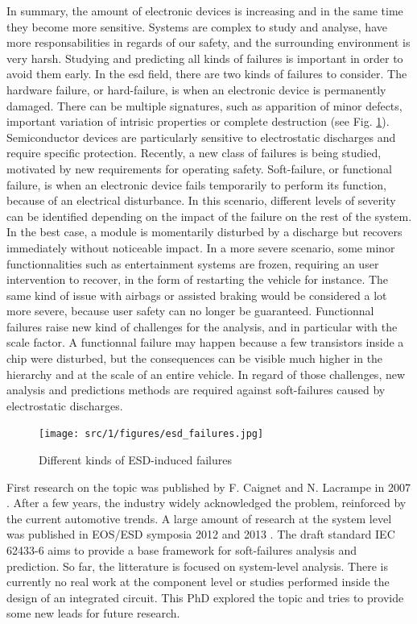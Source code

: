 In summary, the amount of electronic devices is increasing and in the same time they become more sensitive.
Systems are complex to study and analyse, have more responsabilities in regards of our safety, and the surrounding environment is very harsh.
Studying and predicting all kinds of failures is important in order to avoid them early.
In the \gls{esd} field, there are two kinds of failures to consider.
The hardware failure, or hard-failure, is when an electronic device is permanently damaged.
There can be multiple signatures, such as apparition of minor defects, important variation of intrisic properties or complete destruction (see Fig. \ref{fig:esd-failures}).
Semiconductor devices are particularly sensitive to electrostatic discharges \cite{impactESDsemiconductors} and require specific protection.
Recently, a new class of failures is being studied, motivated by new requirements for operating safety.
Soft-failure, or functional failure, is when an electronic device fails temporarily to perform its function, because of an electrical disturbance.
In this scenario, different levels of severity can be identified depending on the impact of the failure on the rest of the system.
In the best case, a module is momentarily disturbed by a discharge but recovers immediately without noticeable impact.
In a more severe scenario, some minor functionnalities such as entertainment systems are frozen, requiring an user intervention to recover, in the form of restarting the vehicle for instance.
The same kind of issue with airbags or assisted braking would be considered a lot more severe, because user safety can no longer be guaranteed.
Functionnal failures raise new kind of challenges for the analysis, and in particular with the scale factor.
A functionnal failure may happen because a few transistors inside a chip were disturbed, but the consequences can be visible much higher in the hierarchy and at the scale of an entire vehicle.
In regard of those challenges, new analysis and predictions methods are required against soft-failures caused by electrostatic discharges.

\begin{figure}[!h]
  \centering
  \texttt{[image: src/1/figures/esd\_failures.jpg]}
  \caption{Different kinds of ESD-induced failures}
  \label{fig:esd-failures}
\end{figure}


First research on the topic was published by F. Caignet and N. Lacrampe in 2007 \cite{}.
After a few years, the industry widely acknowledged the problem, reinforced by the current automotive trends.
A large amount of research at the system level was published in EOS/ESD symposia 2012 \cite{} and 2013 \cite{}.
The draft standard IEC 62433-6 aims to provide a base framework for soft-failures analysis and prediction.
So far, the litterature is focused on system-level analysis.
There is currently no real work at the component level or studies performed inside the design of an integrated circuit.
This PhD explored the topic and tries to provide some new leads for future research.

